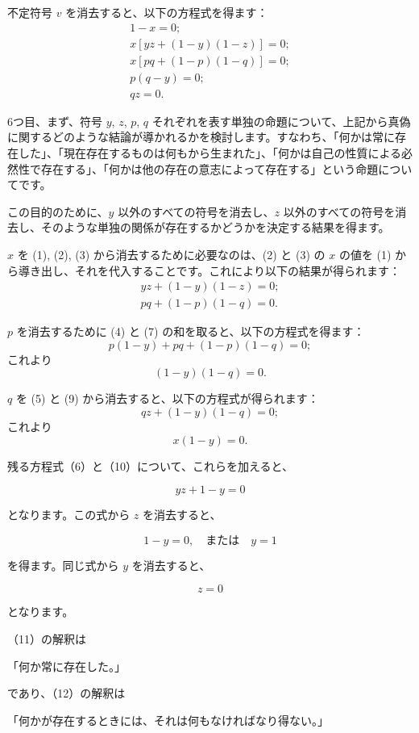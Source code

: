 \documentclass[a4paper,11pt,openany]{ltjsbook}
\begin{document}
不定符号 $v$ を消去すると、以下の方程式を得ます：
\begin{eqnarray}
1-x=0;\\
x[yz+(1-y)(1-z)]=0;\\
x[pq+(1-p)(1-q)]=0;\\
p(q-y)=0;\\
qz=0.
\end{eqnarray}

6つ目、まず、符号 $y$, $z$, $p$, $q$ それぞれを表す単独の命題について、上記から真偽に関するどのような結論が導かれるかを検討します。すなわち、「何かは常に存在した」、「現在存在するものは何もから生まれた」、「何かは自己の性質による必然性で存在する」、「何かは他の存在の意志によって存在する」という命題についてです。

この目的のために、$y$ 以外のすべての符号を消去し、$z$ 以外のすべての符号を消去し、そのような単独の関係が存在するかどうかを決定する結果を得ます。

$x$ を (1), (2), (3) から消去するために必要なのは、(2) と (3) の $x$ の値を (1) から導き出し、それを代入することです。これにより以下の結果が得られます：
\begin{eqnarray}
yz+(1-y)(1-z)=0;\\
pq+(1-p)(1-q)=0.
\end{eqnarray}

$p$ を消去するために (4) と (7) の和を取ると、以下の方程式を得ます：
\[
p(1-y)+pq+(1-p)(1-q)=0;
\]
これより
\[
(1-y)(1-q)=0.
\]

$q$ を (5) と (9) から消去すると、以下の方程式が得られます：
\[
qz + (1-y)(1-q) = 0;
\]
これより
\[
x(1-y) = 0.
\]

残る方程式（6）と（10）について、これらを加えると、

\[
yz + 1 - y = 0
\]

となります。この式から $z$ を消去すると、

\begin{equation}
1 - y = 0, \quad \text{または} \quad y = 1
\end{equation}

を得ます。同じ式から $y$ を消去すると、

\begin{equation}
z = 0
\end{equation}

となります。

（11）の解釈は

「何か常に存在した。」

であり、（12）の解釈は

「何かが存在するときには、それは何もなければなり得ない。」
\end{document}
